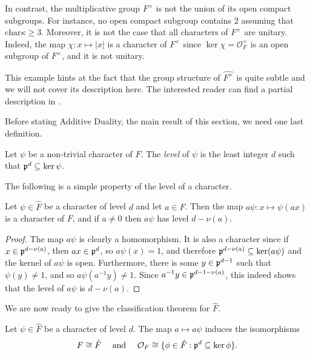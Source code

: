 \begin{example}
    In contrast, the multiplicative group $F^\times$ is not the union of its open compact subgroups. For instance, no open compact subgroup contains $2$ assuming that $\mathrm{char}\kappa\geq 3$. Moreover, it is not the case that all characters of $F^\times$ are unitary. Indeed, the map $\chi:x\mapsto|x|$ is a character of $F^{\times}$ since $\ker\chi=\mathcal{O}_F^\times$ is an open subgroup of $F^\times$, and it is not unitary.

    This example hints at the fact that the group structure of $\hat{F^\times}$ is quite subtle and we will not cover its description here. The interested reader can find a partial description in \cite[\S 1.8]{BH1}.
\end{example}


Before stating Additive Duality, the main result of this section, we need one last definition.

\begin{defn}\label{def:addlevel}
    Let $\psi$ be a non-trivial character of $F$. The \textit{level} of $\psi$ is the least integer $d$ such that $\mathfrak{p}^d\subseteq\ker\psi$.
\end{defn}

The following is a simple property of the level of a character.

\begin{lemma}
    Let $\psi\in\hat{F}$ be a character of level $d$ and let $a\in F$. Then the map $a\psi:x\mapsto\psi(ax)$ is a character of $F$, and if $a\neq0$ then $a\psi$ has level $d-\nu(a)$.
\end{lemma}
\begin{proof}
    The map $a\psi$ is clearly a homomorphism. It is also a character since if $x\in\mathfrak{p}^{d-\nu(a)}$, then $ax\in\mathfrak{p}^d$, so $a\psi(x)=1$, and therefore $\mathfrak{p}^{d-\nu(a)}\subseteq\ker(a\psi)$ and the kernel of $a\psi$ is open. Furthermore, there is some $y\in\mathfrak{p}^{d-1}$ such that $\psi(y)\neq1$, and so $a\psi(a^{-1}y)\neq1$. Since $a^{-1}y\in\mathfrak{p}^{d-1-\nu(a)}$, this indeed shows that the level of $a\psi$ is $d-\nu(a)$. 
\end{proof}

We are now ready to give the classification theorem for $\hat{F}$.

\begin{thm}\label{add_dual}
    Let $\psi\in\hat{F}$ be a character of level $d$. The map $a\mapsto a\psi$ induces the isomorphisms 
    $$F\cong\hat{F} \quad\text{ and }\quad \mathcal{O}_F\cong\{\phi\in\hat{F}:\mathfrak{p}^d\subseteq\ker\phi\}.$$  
\end{thm}

